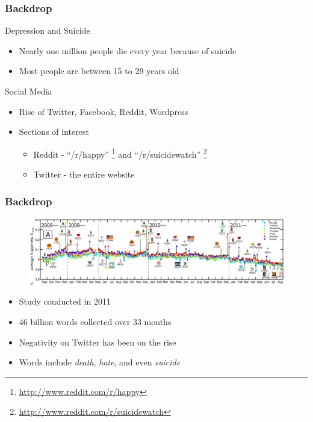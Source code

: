 \documentclass{beamer}
\begin{document}
    \begin{frame}
        \frametitle{Backdrop}
        \begin{block}{Depression and Suicide}
            \begin{itemize}
                \item{Nearly one million people die every year because of suicide}
                \item{Most people are between 15 to 29 years old}
            \end{itemize}
        \end{block}
        \pause
        \begin{block}{Social Media}
            \begin{itemize}
                \item{Rise of Twitter, Facebook, Reddit, Wordpress}
                \item{
                Sections of interest
                \begin{itemize}
                    \item{Reddit - ``/r/happy'' \footnote{\url{http://www.reddit.com/r/happy}} and ``/r/suicidewatch'' \footnote{\url{http://www.reddit.com/r/suicidewatch}}}
                    \item{Twitter - the entire website}
                \end{itemize}
                }
            \end{itemize}
        \end{block}
    \end{frame}
    
    \begin{frame}
        \frametitle{Backdrop}
        \begin{figure}
            \centering
            \includegraphics[width=\textwidth]{figures/twitter_happiness.png}
        \end{figure}
        \begin{itemize}
            \item{Study conducted in 2011}
            \item{46 billion words collected over 33 months}
            \item{Negativity on Twitter has been on the rise}
            \item{Words include \emph{death}, \emph{hate}, and even \emph{suicide}}
        \end{itemize}
    \end{frame}
    
\end{document}
